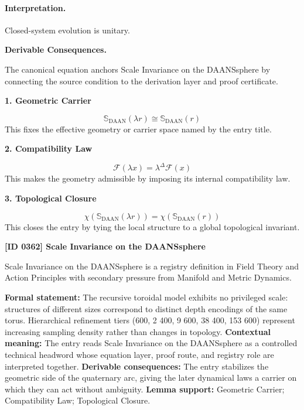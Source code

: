\paragraph{Interpretation.}
Closed-system evolution is unitary.

\par\vspace{0.35em}
\noindent\textbf{Derivable Consequences.}\quad
\begingroup
\footnotesize
\raggedright
The canonical equation anchors Scale Invariance on the DAANSsphere by connecting the source condition to the derivation layer and proof certificate.
\par\endgroup

\noindent\textbf{1. Geometric Carrier}\par
\[
\mathbb{S}_{\mathrm{DAAN}}(\lambda r)\cong\mathbb{S}_{\mathrm{DAAN}}(r)
\]
\noindent This fixes the effective geometry or carrier space named by the entry title.\par
\noindent\textbf{2. Compatibility Law}\par
\[
\mathcal{F}(\lambda x)=\lambda^{\Delta}\mathcal{F}(x)
\]
\noindent This makes the geometry admissible by imposing its internal compatibility law.\par
\noindent\textbf{3. Topological Closure}\par
\[
\chi(\mathbb{S}_{\mathrm{DAAN}}(\lambda r))=\chi(\mathbb{S}_{\mathrm{DAAN}}(r))
\]
\noindent This closes the entry by tying the local structure to a global topological invariant.\par

\clearpage
\noindent\textbf{[ID 0362] Scale Invariance on the DAANSsphere}\par
\vspace{0.35em}
\begingroup\small
{}
Scale Invariance on the DAANSsphere is a registry definition in Field Theory and Action Principles with secondary pressure from Manifold and Metric Dynamics.

\begingroup\footnotesize\setlength{\emergencystretch}{3em}\sloppy
\textbf{Formal statement:} The recursive toroidal model exhibits no privileged scale: structures of different sizes correspond to distinct depth encodings of the same torus. Hierarchical refinement tiers (600, 2 400, 9 600, 38 400, 153 600) represent increasing sampling density rather than changes in topology. \textbf{Contextual meaning:} The entry reads Scale Invariance on the DAANSsphere as a controlled technical headword whose equation layer, proof route, and registry role are interpreted together. \textbf{Derivable consequences:} The entry stabilizes the geometric side of the quaternary arc, giving the later dynamical laws a carrier on which they can act without ambiguity. \textbf{Lemma support:} Geometric Carrier; Compatibility Law; Topological Closure.\par
\endgroup

